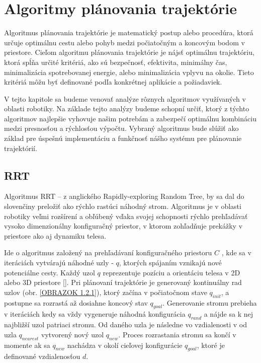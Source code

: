 \section{Algoritmy plánovania trajektórie}
\label{kap:2}
Algoritmus plánovania trajektórie je matematický postup alebo procedúra, ktorá určuje optimálnu cestu alebo pohyb medzi počiatočným a koncovým bodom v priestore.
Cieľom algoritmu plánovania trajektórie je nájsť optimálnu trajektóriu, ktorá spĺňa určité kritériá, ako sú bezpečnosť, efektivita, minimálny čas, minimalizácia spotrebovanej energie, alebo minimalizácia vplyvu na okolie. Tieto kritériá môžu byť definované podľa konkrétnej aplikácie a požiadaviek.

V tejto kapitole sa budeme venovať analýze rôznych algoritmov využívaných v oblasti robotiky. Na základe tejto analýzy budeme schopní určiť, ktorý z týchto algoritmov najlepšie vyhovuje našim potrebám a zabezpečí optimálnu kombináciu medzi presnosťou a rýchlosťou výpočtu. Vybraný algoritmus bude slúžiť ako základ pre úspešnú implementáciu a funkčnosť nášho systému pre plánovanie trajektórií.
 
\subsection{RRT}
\label{kap:2.1}

Algoritmus RRT – z anglického Rapidly-exploring Random Tree, by sa dal do slovenčiny preložiť ako rýchlo rastúci náhodný strom. Algoritmus je v oblasti robotiky veľmi rozšírení a obľúbený vďaka svojej schopnosti rýchlo prehľadávať vysoko dimenzionálny konfiguračný priestor, v ktorom zohľadňuje prekážky v priestore ako aj dynamiku telesa. \newline

Ide o algoritmus založený na prehľadávaní konfiguračného priestoru $C$ , kde sa v iteráciách vytvárajú náhodné uzly - $q$, ktorých spájaním vznikajú nové potenciálne cesty. Každý uzol $q$ reprezentuje pozíciu a orientáciu telesa v 2D alebo 3D priestore []. Pri plánovaní trajektórie je generovaný kontinuálny rad uzlov (obr. \ref{OBRAZOK 1.2.1}), ktorý začína v počiatočnom stave $q_{init}$,  a postupne sa rozrastá až dosiahne koncový stav $q_{goal}$.  Generovanie stromu prebieha v iteráciách kedy sa vždy vygeneruje náhodná konfigurácia $q_{rand}$ a nájde sa k nej najbližší uzol patriaci stromu. Od daného uzla je následne vo vzdialenosti v od uzla $q_{nearest}$ vytvorený nový uzol $q_{new}$. Proces rozrastania stromu sa končí v momente ak sa $q_{new}$  nachádza v okolí cieľovej konfigurácie $q_{goal}$, ktoré je definované vzdialenosťou $d$. 

